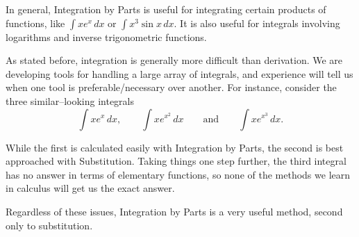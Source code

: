 In general, Integration by Parts is useful for integrating certain products of functions, like $\int x e^x\,dx$ or $\int x^3\sin x\,dx$.   It is also useful for integrals involving logarithms and inverse trigonometric functions.  

As stated before, integration is generally more difficult than derivation. We are developing tools for handling a large array of integrals, and experience will tell us when one tool is preferable/necessary over another. For instance, consider the three similar--looking integrals 
$$\int xe^x\,dx, \qquad  \int x e^{x^2}\,dx \qquad \text{and} \qquad \int xe^{x^3}\,dx.$$

While the first is calculated easily with Integration by Parts, the second is best approached with Substitution.  Taking things one step further, the third integral has no answer in terms of elementary functions, so none of the methods we learn in calculus will get us the exact answer.

Regardless of these issues, Integration by Parts is a very useful method, second only to substitution.





